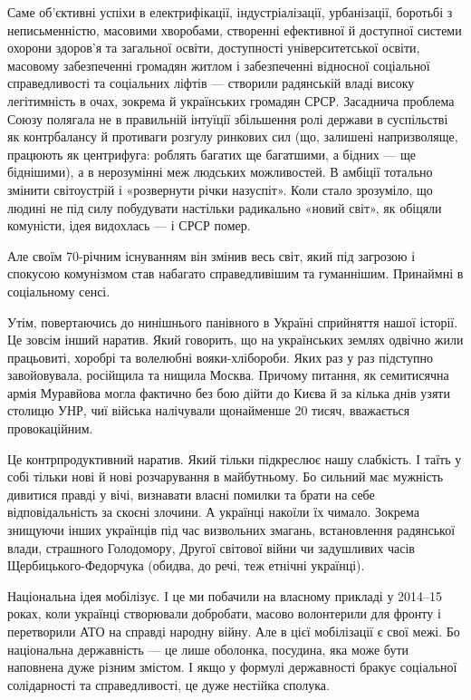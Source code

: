 Саме об’єктивні успіхи в електрифікації, індустріалізації, урбанізації,
боротьбі з неписьменністю, масовими хворобами, створенні ефективної й доступної
системи охорони здоров’я та загальної освіти, доступності університетської
освіти, масовому забезпеченні громадян житлом і забезпеченні відносної
соціальної справедливості та соціальних ліфтів — створили радянській владі
високу легітимність в очах, зокрема й українських громадян СРСР. Засаднича
проблема Союзу полягала не в правильній інтуїції збільшення ролі держави в
суспільстві як контрбалансу й противаги розгулу ринкових сил (що, залишені
напризволяще, працюють як центрифуга: роблять багатих ще багатшими, а бідних —
ще біднішими), а в нерозумінні меж людських можливостей. В амбіції тотально
змінити світоустрій і «розвернути річки назуспіт». Коли стало зрозуміло, що
людині не під силу побудувати настільки радикально «новий світ», як обіцяли
комуністи, ідея видохлась — і СРСР помер.

Але своїм 70-річним існуванням він змінив весь світ, який під загрозою і
спокусою комунізмом став набагато справедливішим та гуманнішим. Принаймні в
соціальному сенсі. 

Утім, повертаючись до нинішнього панівного в Україні сприйняття нашої історії.
Це зовсім інший наратив. Який говорить, що на українських землях одвічно жили
працьовиті, хоробрі та волелюбні вояки-хлібороби. Яких раз у раз підступно
завойовувала, російщила та нищила Москва. Причому питання, як семитисячна армія
Муравйова могла фактично без бою дійти до Києва й за кілька днів узяти столицю
УНР, чиї війська налічували щонайменше 20 тисяч, вважається провокаційним. 

Це контрпродуктивний наратив. Який тільки підкреслює нашу слабкість. І таїть у
собі тільки нові й нові розчарування в майбутньому. Бо сильний має мужність
дивитися правді у вічі, визнавати власні помилки та брати на себе
відповідальність за скоєні злочини. А українці накоїли їх чимало. Зокрема
знищуючи інших українців під час визвольних змагань, встановлення радянської
влади, страшного Голодомору, Другої світової війни чи задушливих часів
Щербицького-Федорчука (обидва, до речі, теж етнічні українці).

Національна ідея мобілізує. І це ми побачили на власному прикладі у 2014–15
роках, коли українці створювали добробати, масово волонтерили для фронту і
перетворили АТО на справді народну війну. Але в цієї мобілізації є свої межі.
Бо національна державність — це лише оболонка, посудина, яка може бути
наповнена дуже різним змістом. І якщо у формулі державності бракує соціальної
солідарності та справедливості, це дуже нестійка сполука. 

